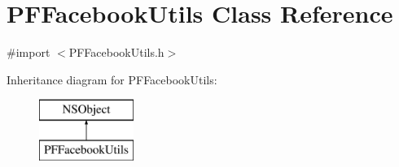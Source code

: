 \hypertarget{interface_p_f_facebook_utils}{}\section{P\+F\+Facebook\+Utils Class Reference}
\label{interface_p_f_facebook_utils}


{\ttfamily \#import $<$P\+F\+Facebook\+Utils.\+h$>$}

Inheritance diagram for P\+F\+Facebook\+Utils\+:\begin{figure}[H]
\begin{center}
\leavevmode
\includegraphics[height=2.000000cm]{interface_p_f_facebook_utils}
\end{center}
\end{figure}
